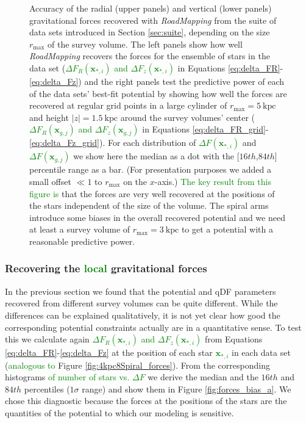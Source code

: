 \documentclass[iop,revtex4,numberedappendix,appendixfloats]{emulateapj}
\newcommand{\vect}[1]{\boldsymbol{#1}}
\newcommand{\RM}{{\sl RoadMapping}}
\newcommand{\NEW}[1]{\textcolor{Green}{#1}}
\newcommand{\OLD}[1]{}
\begin{document}
{\begin{figure}[!htbp]
\caption{Accuracy of the radial (upper panels) and vertical (lower panels) gravitational forces recovered with \RM{} from the suite of data sets introduced in Section \ref{sec:suite}, depending on the size $r_\text{max}$ of the survey volume. The left panels show how well \RM{} recovers the forces for the ensemble of stars in the data set (\OLD{$\Delta F_{R}(*_i)$ and $\Delta F_{z}(*_i)$}\NEW{$\Delta F_{R}(\vect{x}_{*,i})$ and $\Delta F_{z}(\vect{x}_{*,i})$} in Equations \eqref{eq:delta_FR}-\eqref{eq:delta_Fz}) and the right panels test the predictive power of each of the data sets' best-fit potential by showing how well the forces are recovered at regular grid points in a large cylinder of $r_\text{max}=5~\text{kpc}$ and height $|z|=1.5~\text{kpc}$ around the survey volumes' center (\OLD{$\Delta F_{R}(g_j)$ and $\Delta F_{z}(g_j)$}\NEW{$\Delta F_{R}(\vect{x}_{g,j})$ and $\Delta F_{z}(\vect{x}_{g,j})$} in Equations \eqref{eq:delta_FR_grid}-\eqref{eq:delta_Fz_grid}). For each distribution of \OLD{$\Delta F(*_i)$}\NEW{$\Delta F(\vect{x}_{*,i})$} and \OLD{$\Delta F(g_j)$}\NEW{$\Delta F(\vect{x}_{g,j})$} we show here the median as a dot with the  [$16th$,$84th$] percentile range as a bar. (For presentation purposes we added a small offset $\ll 1$ to $r_\text{max}$ on the $x$-axis.) \OLD{We find}\NEW{The key result from this figure is} that the forces are very well recovered at the positions of the stars independent of the size of the volume. The spiral arms introduce some biases in the overall recovered potential and we need at least a survey volume of $r_\text{max}=3~\text{kpc}$ to get a potential with a reasonable predictive power.}
\label{fig:forces_bias}
\end{figure}
}


\subsubsection{Recovering the \NEW{local} gravitational forces} \label{sec:local_grav_forces}

In the previous section we found that the potential and qDF parameters recovered from different survey volumes can be quite different. While the differences can be explained qualitatively, it is not yet clear how good the corresponding potential constraints actually are in a quantitative sense. To test this we calculate again \OLD{$\Delta F_R(*_i)$ and $\Delta F_z(*_i)$}\NEW{$\Delta F_R(\vect{x}_{*,i})$ and $\Delta F_z(\vect{x}_{*,i})$} from Equations \eqref{eq:delta_FR}-\eqref{eq:delta_Fz} at the position of each star \OLD{$*_i$}\NEW{$\vect{x}_{*,i}$} in each data set (\OLD{see also}\NEW{analogous to} Figure \ref{fig:4kpc8Spiral_forces}). From the corresponding histograms \NEW{of number of stars vs. $\Delta F$} we derive the median and the $16th$ and $84th$ percentiles ($1\sigma$ range) and show them in Figure \ref{fig:forces_bias_a}. We chose this diagnostic because the forces at the positions of the stars are the quantities of the potential to which our modeling is sensitive.
\end{document}
